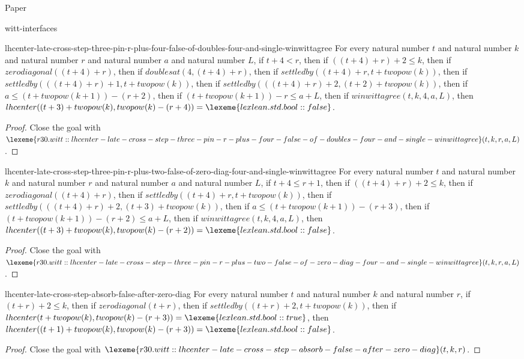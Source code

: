 \begin{lexlean}{Paper}
\begin{section}{witt-interfaces}
  \begin{theorem}{lhcenter-late-cross-step-three-pin-r-plus-four-false-of-doubles-four-and-single-winwittagree}
  For every natural number \(t\) and natural number \(k\) and natural number \(r\) and natural number \(a\) and natural number \(L\), if \(t + 4 < r\), then if \(((t + 4) + r) + 2 ≤ k\), then if \(zerodiagonal((t + 4) + r)\), then if \(doublesat(4, (t + 4) + r)\), then if \(settledby((t + 4) + r, t + twopow(k))\), then if \(settledby(((t + 4) + r) + 1, t + twopow(k))\), then if \(settledby(((t + 4) + r) + 2, (t + 2) + twopow(k))\), then if \(a ≤ (t + twopow(k + 1)) - (r + 2)\), then if \((t + twopow(k + 1)) - r ≤ a + L\), then if \(winwittagree(t, k, 4, a, L)\), then \(lhcenter((t + 3) + twopow(k), twopow(k) - (r + 4)) = \lexeme{lexlean.std.bool::false}\).
  \begin{proof}
  Close the goal with \(\lexeme{r30.witt::lhcenter-late-cross-step-three-pin-r-plus-four-false-of-doubles-four-and-single-winwittagree}(t, k, r, a, L)\).
  \end{proof}
  \end{theorem}

  \begin{theorem}{lhcenter-late-cross-step-three-pin-r-plus-two-false-of-zero-diag-four-and-single-winwittagree}
  For every natural number \(t\) and natural number \(k\) and natural number \(r\) and natural number \(a\) and natural number \(L\), if \(t + 4 ≤ r + 1\), then if \(((t + 4) + r) + 2 ≤ k\), then if \(zerodiagonal((t + 4) + r)\), then if \(settledby((t + 4) + r, t + twopow(k))\), then if \(settledby(((t + 4) + r) + 2, (t + 3) + twopow(k))\), then if \(a ≤ (t + twopow(k + 1)) - (r + 3)\), then if \((t + twopow(k + 1)) - (r + 2) ≤ a + L\), then if \(winwittagree(t, k, 4, a, L)\), then \(lhcenter((t + 3) + twopow(k), twopow(k) - (r + 2)) = \lexeme{lexlean.std.bool::false}\).
  \begin{proof}
  Close the goal with \(\lexeme{r30.witt::lhcenter-late-cross-step-three-pin-r-plus-two-false-of-zero-diag-four-and-single-winwittagree}(t, k, r, a, L)\).
  \end{proof}
  \end{theorem}

  \begin{theorem}{lhcenter-late-cross-step-absorb-false-after-zero-diag}
  For every natural number \(t\) and natural number \(k\) and natural number \(r\), if \((t + r) + 2 ≤ k\), then if \(zerodiagonal(t + r)\), then if \(settledby((t + r) + 2, t + twopow(k))\), then if \(lhcenter(t + twopow(k), twopow(k) - (r + 3)) = \lexeme{lexlean.std.bool::true}\), then \(lhcenter((t + 1) + twopow(k), twopow(k) - (r + 3)) = \lexeme{lexlean.std.bool::false}\).
  \begin{proof}
  Close the goal with \(\lexeme{r30.witt::lhcenter-late-cross-step-absorb-false-after-zero-diag}(t, k, r)\).
  \end{proof}
  \end{theorem}


\end{section}
\end{lexlean}
